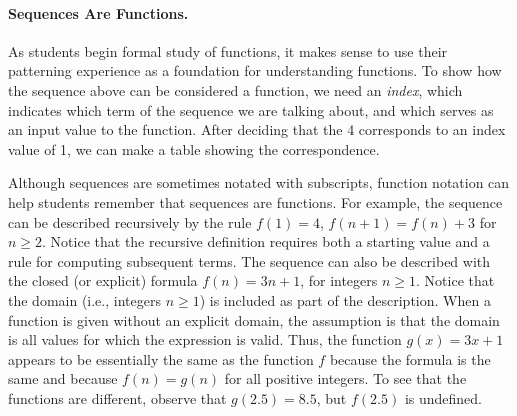 \paragraph{Sequences Are Functions.} As students begin formal study of functions, it makes sense to use their patterning experience as a foundation for understanding functions.  To show how the sequence above can be considered a function, we need an \textit{index}, which indicates which term of the sequence we are talking about, and which serves as an input value to the function.  After deciding that the 4 corresponds to an index value of 1, we can make a table showing 
the correspondence.


Although sequences are sometimes notated with subscripts, function notation can help students remember that sequences are functions.  For example, the sequence can be described recursively by the rule $f(1) = 4$, $f(n+1) = f(n) + 3$ for $n \geq 2$.  Notice that the recursive definition requires both a starting value and a rule for computing subsequent terms.   
The sequence can also be described with the closed (or explicit) formula  $f(n) = 3n + 1$, for integers $n \geq 1$.  Notice that the domain (i.e., integers $n\geq 1$) is included as part of the description.  When a function is given without an explicit domain, the assumption is that the domain is all values for which the expression is valid.  Thus, the function $g(x) = 3x + 1$ appears to be essentially the same as the function $f$ because the formula is the same and because $f(n) = g(n)$ for all positive integers.  To see that the functions are different, observe that $g(2.5) = 8.5$, but $f(2.5)$ is undefined.  

